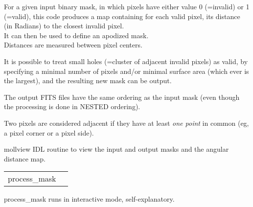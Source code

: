 \begin{codedescription}
{For a given input binary mask, in which pixels have either value 0 (=invalid) or 1 (=valid),
this code produces a map containing for each valid pixel,
its distance (in Radians) to the closest invalid pixel.\\
It can then be used to define an apodized mask.\\
Distances are measured between pixel centers.

It is possible to treat small holes (=cluster of adjacent invalid pixels) as valid,
by specifying a minimal number of pixels and/or minimal surface area (which ever is the largest),
and the resulting new mask can be output.

The output FITS files have the same ordering as the input mask
(even though the processing is done in NESTED ordering).

Two pixels are considered adjacent if they have at least {\em one point} in common 
(eg, a pixel corner or a pixel side).%
}
\end{codedescription}


\begin{support}
  \begin{sulist}{} %
  \item[mollview] IDL routine to view the input and output masks and the angular
distance map.
  \end{sulist}
\end{support}

\begin{examples}{1}
{
\begin{tabular}{ll} %
process\_mask  \\
\end{tabular}
}
{
process\_mask runs in interactive mode, self-explanatory.
}
\end{examples}

